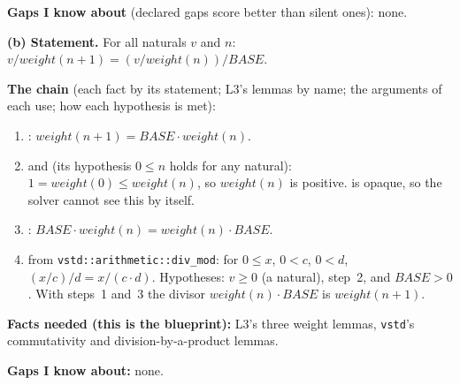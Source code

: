 \documentclass[11pt]{article}
\begin{document}
\begin{answer}
\textbf{Gaps I know about} (declared gaps score better than silent ones):
none.

\textbf{(b) Statement.} For all naturals $v$ and $n$:
$v / \mathit{weight}(n + 1) = (v / \mathit{weight}(n)) / \mathit{BASE}$.

\textbf{The chain} (each fact by its statement; L3's lemmas by name; the
arguments of each use; how each hypothesis is met):
\begin{enumerate}
\item {}: $\mathit{weight}(n + 1) = \mathit{BASE}
  \cdot \mathit{weight}(n)$.
\item {} and  (its
  hypothesis $0 \leq n$ holds for any natural): $1 = \mathit{weight}(0) \leq
  \mathit{weight}(n)$, so $\mathit{weight}(n)$ is positive.  is
  opaque, so the solver cannot see this by itself.
\item {}:
  $\mathit{BASE} \cdot \mathit{weight}(n) = \mathit{weight}(n) \cdot
  \mathit{BASE}$.
\item {} from
  \texttt{vstd::arithmetic::div\_mod}: for $0 \leq x$, $0 < c$, $0 < d$,
  $(x / c) / d = x / (c \cdot d)$. Hypotheses: $v \geq 0$ (a natural), step~2,
  and $\mathit{BASE} > 0$. With steps~1 and~3 the divisor $\mathit{weight}(n)
  \cdot \mathit{BASE}$ is $\mathit{weight}(n + 1)$.
\end{enumerate}

\textbf{Facts needed (this is the blueprint):} L3's three weight lemmas,
\texttt{vstd}'s commutativity and division-by-a-product lemmas.

\textbf{Gaps I know about:} none.
\end{answer}

\end{document}
